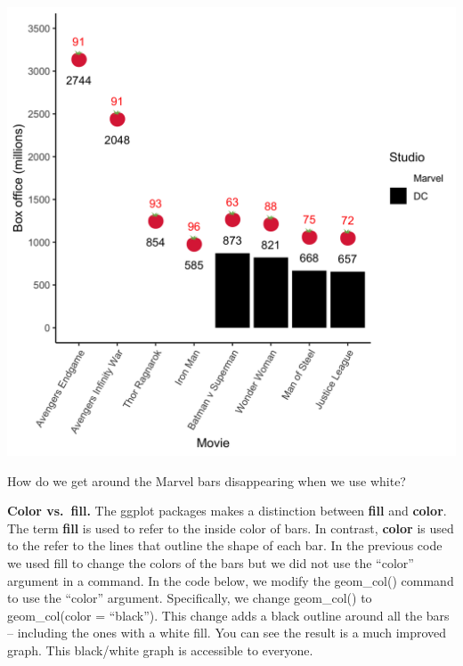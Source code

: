 \documentclass[
]{krantz}
\begin{document}
\includegraphics[width=0.65\linewidth]{ch_graphing/images/emoji_graph2}

How do we get around the Marvel bars disappearing when we use white?

\textbf{Color vs.~fill.} The ggplot packages makes a distinction between \textbf{fill} and \textbf{color}. The term \textbf{fill} is used to refer to the inside color of bars. In contrast, \textbf{color} is used to the refer to the lines that outline the shape of each bar. In the previous code we used fill to change the colors of the bars but we did not use the ``color'' argument in a command. In the code below, we modify the geom\_col() command to use the ``color'' argument. Specifically, we change geom\_col() to geom\_col(color = ``black''). This change adds a black outline around all the bars -- including the ones with a white fill. You can see the result is a much improved graph. This black/white graph is accessible to everyone.
\end{document}
